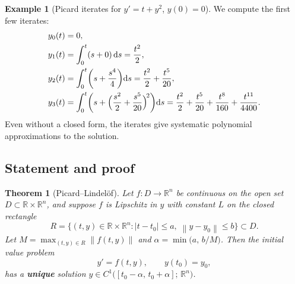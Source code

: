\documentclass[12pt,a4paper,openany]{book}
\theoremstyle{definition}
\newtheorem{example}[definition]{Example}
\theoremstyle{plain}
\newtheorem{theorem}[definition]{Theorem}
\theoremstyle{remark}
\newcommand{\R}{\mathbb{R}}
\newcommand{\dd}{\mathrm{d}}
\newcommand{\abs}[1]{\left|#1\right|}
\newcommand{\norm}[1]{\left\|#1\right\|}
\begin{document}
\begin{center}
\end{center}

\begin{example}[Picard iterates for $y' = t + y^2$, $y(0) = 0$]\label{ex:picard-nonlinear}
We compute the first few iterates:
\begin{align*}
  y_0(t) &= 0, \\
  y_1(t) &= \int_0^t (s + 0)\,\dd s = \frac{t^2}{2}, \\
  y_2(t) &= \int_0^t \biggl(s + \frac{s^4}{4}\biggr)\dd s
           = \frac{t^2}{2} + \frac{t^5}{20}, \\
  y_3(t) &= \int_0^t \biggl(s + \Bigl(\frac{s^2}{2} + \frac{s^5}{20}\Bigr)^{\!2}\biggr)\dd s
           = \frac{t^2}{2} + \frac{t^5}{20} + \frac{t^8}{160} + \frac{t^{11}}{4400}.
\end{align*}
Even without a closed form, the iterates give systematic polynomial approximations
to the solution.
\end{example}

\subsection{Statement and proof}

\begin{theorem}[Picard--Lindel\"of]\label{thm:picard-lindelof}
Let $f\colon D \to \R^n$ be continuous on the open set
$D \subset \R \times \R^n$, and suppose $f$ is Lipschitz in $y$ with constant
$L$ on the closed rectangle
\[
  R = \bigl\{(t,y) \in \R \times \R^n : \abs{t - t_0} \le a,\;
  \norm{y - y_0} \le b\bigr\} \subset D.
\]
Let $M = \max_{(t,y) \in R} \norm{f(t,y)}$ and
$\alpha = \min\bigl(a, \, b/M\bigr)$. Then the initial value problem
\[
  y' = f(t,y), \qquad y(t_0) = y_0,
\]
has a \textbf{unique} solution $y \in C^1\bigl([t_0 - \alpha,\, t_0 + \alpha];\, \R^n\bigr)$.
\end{theorem}
\end{document}
